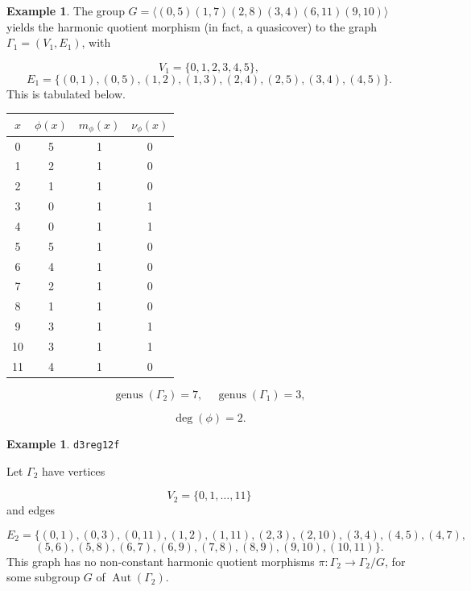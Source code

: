 \documentclass[12pt,letterpaper]{article}
\theoremstyle{definition}
\newtheorem{example}[theorem]{Example}
\DeclareMathOperator{\Aut}{Aut}
\DeclareMathOperator{\genus}{genus}
\begin{document}
\begin{example}
{The group
$G = \langle (0,5)(1,7)(2,8)(3,4)(6,11)(9,10) \rangle$ yields the
harmonic quotient morphism (in fact, a quasicover) to the graph
$\Gamma_1 = (V_1,E_1)$, with

\[
V_1=\{0, 1, 2, 3, 4, 5\},
\]
\[
E_1=\{
(0, 1), (0, 5), (1, 2), (1, 3), (2, 4), (2, 5), (3, 4), (4, 5)
\}.
\]
This is tabulated below.

\begin{center}
\begin{tabular}{c|c|c|c}  
  $x$ & $\phi(x)$ & $m_\phi(x)$ & $\nu_\phi(x)$ \\ \hline
  0   &    5   &        1         &  0   \\ 
  1   &    2   &        1         &  0   \\ 
  2   &    1   &        1         &  0   \\ 
  3   &    0   &        1         &  1   \\ 
  4   &    0   &        1         &  1   \\ 
  5   &    5   &        1         &  0    \\ 
  6   &    4   &        1         &  0   \\ 
  7   &    2   &        1         &  0   \\
  8   &    1   &        1         &  0   \\
  9   &    3   &        1         &  1   \\
  10   &   3   &        1         &  1   \\
  11  &    4   &        1         &  0   \\ 
\end{tabular}
\end{center}

\[
  \genus(\Gamma_2) =7,\ \ \ \ \
  \genus(\Gamma_1) =3,
\]

\[
\deg(\phi) =2.
\]

}
\end{example}



\begin{example}%
\label{example:d3reg12f}
  {\tt d3reg12f}\newline
{\rm  
Let $\Gamma_2$ have vertices

\[
V_2=\{0,1,\dots,11\}
\]
and edges

\[
E_2 = \{
(0, 1), (0, 3), (0, 11), (1, 2), (1, 11), (2, 3), (2, 10), (3, 4), (4, 5), (4, 7),
\]
\[
(5, 6), (5, 8), (6, 7), (6, 9), (7, 8), (8, 9), (9, 10), (10, 11)
\}.
\]
This graph has no non-constant harmonic quotient
morphisms $\pi: \Gamma_2\to \Gamma_2/G$, for some subgroup
$G$ of $\Aut(\Gamma_2)$.

}
\end{example}
\end{document}
